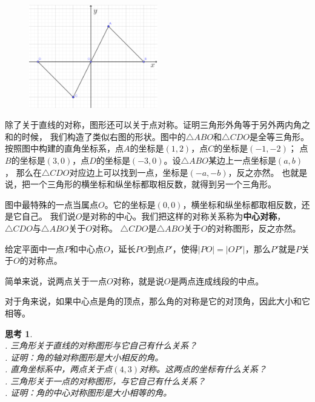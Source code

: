\documentclass[12pt,UTF8]{ctexbook}
\newtheorem{sk}{思考}[section]
\begin{document}
\begin{figure} %
    \vspace{-15pt}
    \centering
    \includegraphics[width=0.5\textwidth]{轴对称1.png}
\end{figure}

除了关于直线的对称，图形还可以关于点对称。证明三角形外角等于另外两内角之和的时候，
我们构造了类似右图的形状。图中的$\triangle ABO$和$\triangle CDO$是全等三角形。
按照图中构建的直角坐标系，点$A$的坐标是$(1,2)$，点$C$的坐标是$(-1, -2)$；
点$B$的坐标是$(3,0)$，点$D$的坐标是$(-3, 0)$。设$\triangle ABO$某边上一点坐标是$(a, b)$，
那么在$\triangle CDO$对应边上可以找到一点，坐标是$(-a, -b)$，反之亦然。
也就是说，把一个三角形的横坐标和纵坐标都取相反数，就得到另一个三角形。

图中最特殊的一点当属点$O$。它的坐标是$(0,0)$，横坐标和纵坐标都取相反数，还是它自己。
我们说$O$是对称的中心。我们把这样的对称关系称为\textbf{中心对称}，$\triangle CDO$与$\triangle ABO$关于$O$对称。
$\triangle CDO$是$\triangle ABO$关于$O$的对称图形，反之亦然。

给定平面中一点$P$和中心点$O$，延长$PO$到点$P'$，使得$|PO| = |OP'|$，那么$P'$就是$P$关于$O$的对称点。

简单来说，说两点关于一点$O$对称，就是说$O$是两点连成线段的中点。

对于角来说，如果中心点是角的顶点，那么角的对称是它的对顶角，因此大小和它相等。

\begin{sk}\label{sk:4-1-0}
    \mbox{} \\
    . 三角形关于直线的对称图形与它自己有什么关系？\\
    . 证明：角的轴对称图形是大小相反的角。\\
    . 直角坐标系中，两点关于点$(4,3)$对称。这两点的坐标有什么关系？\\
    . 三角形关于一点的对称图形，与它自己有什么关系？\\
    . 证明：角的中心对称图形是大小相等的角。
\end{sk}
\end{document}
